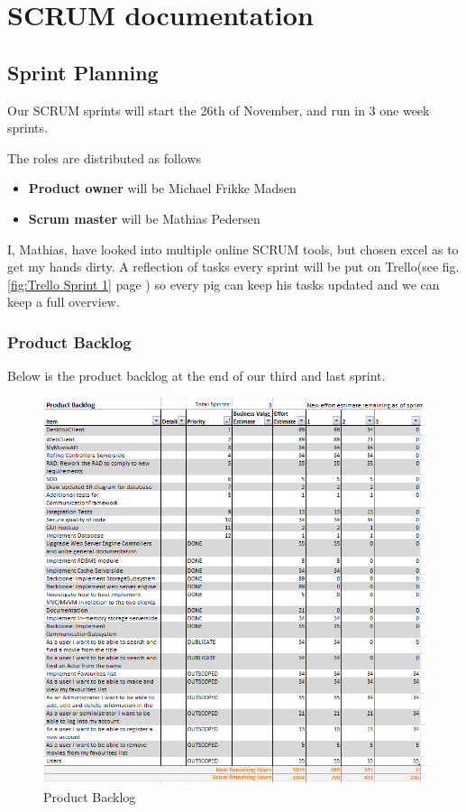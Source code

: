 \chapter{SCRUM documentation}

\section{Sprint Planning}

Our SCRUM sprints will start the 26th of November, and run in 3 one week sprints.

The roles are distributed as follows

\begin{itemize}
\item \textbf{Product owner} will be Michael Frikke Madsen
\item \textbf{Scrum master} will be Mathias Pedersen
\end{itemize}

I, Mathias, have looked into multiple online SCRUM tools, but chosen excel as to get my hands dirty. A reflection of tasks every sprint will be put on Trello(see fig. \ref{fig:Trello Sprint 1} page \pageref{fig:Trello Sprint 1}) so every pig can keep his tasks updated and we can keep a full overview.

\subsection{Product Backlog}
\label{sec:Product Backlog}
Below is the product backlog at the end of our third and last sprint.

\begin{figure}[H]
\includegraphics[scale=0.75]{img/SCRUM/productBacklog.PNG}
\caption{Product Backlog}
\label{fig:Product Backlog}
\end{figure}



